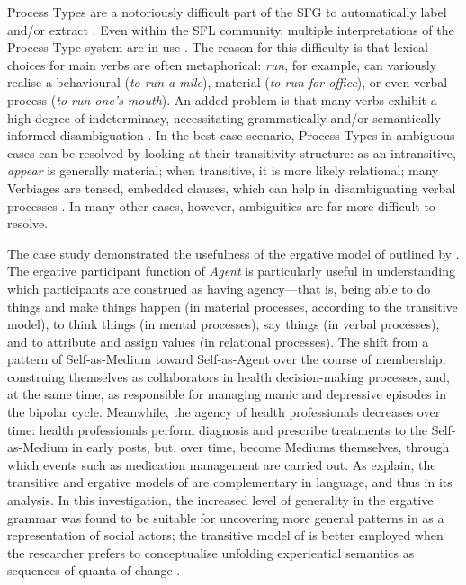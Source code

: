 \noindent Process Types are a notoriously difficult part of the \gls{SFG} to automatically label and\slash or extract \cite{costetchi_method_2013}. Even within the \gls{SFL} community, multiple interpretations of the Process Type system are in use \cite[c.f. the \emph{Cardiff Grammar}---][]{fawcett_theory_2000}. The reason for this difficulty is that lexical choices for main verbs are often metaphorical: \emph{run}, for example, can variously realise a behavioural (\emph{to run a mile}), material (\emph{to run for office}), or even verbal process (\emph{to run one's mouth}). An added problem is that many verbs exhibit a high degree of indeterminacy, necessitating grammatically and\slash or semantically informed disambiguation \cite{odonnell_survey_2009,gwilliams_indeterminacy_2015}. In the best case scenario, Process Types in ambiguous cases can be resolved by looking at their transitivity structure: as an intransitive, \emph{appear} is generally material; when transitive, it is more likely relational; many Verbiages are tensed, embedded clauses, which can help in disambiguating verbal processes \cite{gwilliams_indeterminacy_2015}. In many other cases, however, ambiguities are far more difficult to resolve.

The case study demonstrated the usefulness of the ergative model of  outlined by \textcite{halliday_notes_1968,halliday_notes_1967-1,halliday_notes_1967}. The ergative participant function of \emph{Agent} is particularly useful in understanding which participants are construed as having agency---that is, being able to do things and make things happen (in material processes, according to the transitive model), to think things (in mental processes), say things (in verbal processes), and to attribute and assign values (in relational processes). The   shift from a pattern of Self\hyp{}as\hyp{}Medium toward Self\hyp{}as\hyp{}Agent over the course of membership, construing themselves as collaborators in health decision\hyp{}making processes, and, at the same time, as responsible for managing manic and depressive episodes in the \gls{bipolar} cycle. Meanwhile, the agency of health professionals decreases over time: health professionals perform diagnosis and prescribe treatments to the Self\hyp{}as\hyp{}Medium in early \glspl{post}, but, over time, become Mediums themselves, through which events such as medication management are carried out. As \textcite{halliday_introduction_2004} explain, the transitive and ergative models of  are complementary in language, and thus in its analysis. In this investigation, the increased level of generality in the ergative grammar was found to be suitable for uncovering more general patterns in  as a representation of social actors; the transitive model of  is better employed when the researcher prefers to conceptualise unfolding experiential semantics as sequences of quanta of change \cite{halliday1999construing}.


